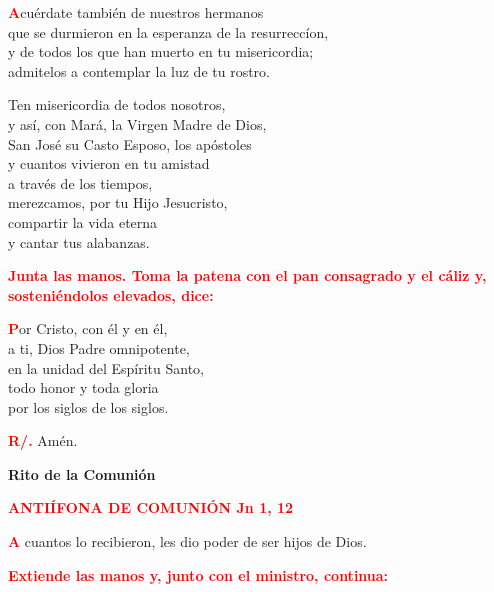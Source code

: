 \documentclass[12pt, letterpaper]{report}
\begin{document}
\lettrine[lines=1]{\bfseries \textcolor{red}{A}}{}\Large cu\'erdate tambi\'en de nuestros hermanos\\
que se durmieron en la esperanza de la resurrecc\'ion,\\
y de todos los que han muerto en tu misericordia;\\
admitelos a contemplar la luz de tu rostro.\newline

Ten misericordia de todos nosotros,\\
y as\'i, con Mar\'a, la Virgen Madre de Dios,\\
San Jos\'e su Casto Esposo, los ap\'ostoles\\
y cuantos vivieron en tu amistad\\
a trav\'es de los tiempos,\\
merezcamos, por tu Hijo Jesucristo,\\
compartir la vida eterna\\
y cantar tus alabanzas. \newline

\large{\bfseries \textcolor{red}{Junta las manos. Toma la patena con el pan consagrado y el c\'aliz y, sosteni\'endolos elevados, dice:}}

\lettrine[lines=1]{\bfseries \textcolor{red}{P}}{}\Large or Cristo, con \'el y en \'el,\\
a ti, Dios Padre omnipotente,\\
en la unidad del Esp\'iritu Santo,\\
todo honor y toda gloria\\
por los siglos de los siglos.\newline

\Large \hspace{-0.9cm} {\bfseries \textcolor{red}{R/.}} \hspace{0.5cm} Am\'en.

\newpage

\begin{center}
\Huge {\bfseries Rito de la Comuni\'on}
\end{center}

\Large {\bfseries \textcolor{red}{ANTI\'IFONA DE COMUNI\'ON \hspace{2cm} Jn 1, 12}}

\lettrine[lines=1]{\bfseries \textcolor{red}{A}}{} \Large cuantos lo recibieron, les dio poder de ser hijos de Dios.\newline

\large{\bfseries \textcolor{red}{Extiende las manos y, junto con el ministro, continua:}}\newline
\end{document}
